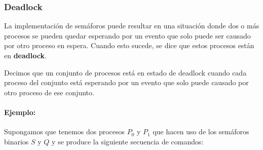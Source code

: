 %
%
%
%
%
%	

\subsubsection{Deadlock}
La implementación de semáforos puede resultar en una situación donde dos o más procesos se pueden quedar esperando por un evento que solo puede ser causado por otro proceso en espera.  Cuando esto sucede, se dice que estos procesos están en \textbf{deadlock}.

Decimos que un conjunto de procesos está en estado de deadlock cuando cada proceso del conjunto está esperando por un evento que solo puede causado por otro proceso de ese conjunto.

\paragraph{Ejemplo:} Supongamos que tenemos dos procesos $P_0$ y $P_1$ que hacen uso de los semáforos binarios $S$ y $Q$ y se produce la siguiente secuencia de comandos:

